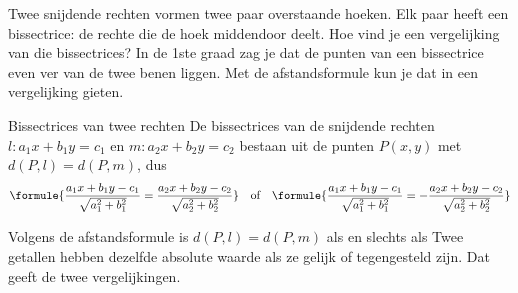 Twee snijdende rechten vormen twee paar overstaande hoeken. Elk paar heeft een bissectrice: de rechte die de hoek middendoor deelt. Hoe vind je een vergelijking van die bissectrices? In de 1ste graad zag je dat de punten van een bissectrice even ver van de twee benen liggen. Met de afstandsformule kun je dat in een vergelijking gieten.


\begin{theorie}
\begin{stelling}{Bissectrices van twee rechten}
De bissectrices van de snijdende rechten $l\colon a_1 x + b_1 y = c_1$ en $m\colon a_2 x + b_2 y = c_2$ bestaan uit de punten $P(x, y)$ met $d(P, l) = d(P, m)$, dus
\[ \formule{\frac{a_1 x + b_1 y - c_1}{\sqrt{a_1^2 + b_1^2}} = \frac{a_2 x + b_2 y - c_2}{\sqrt{a_2^2 + b_2^2}}} \quad\text{of}\quad \formule{\frac{a_1 x + b_1 y - c_1}{\sqrt{a_1^2 + b_1^2}} = -\frac{a_2 x + b_2 y - c_2}{\sqrt{a_2^2 + b_2^2}}} \]
\end{stelling}
\begin{bewijs}
Volgens de afstandsformule is $d(P, l) = d(P, m)$ als en slechts als
Twee getallen hebben dezelfde absolute waarde als ze gelijk of tegengesteld zijn. Dat geeft de twee vergelijkingen.
\end{bewijs}
\end{theorie}


